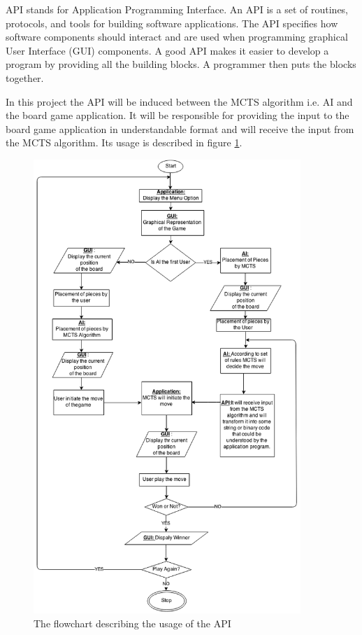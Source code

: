 API stands for Application Programming Interface. An API is a set of routines, protocols, and tools for building software applications. The API specifies how software components should interact and are used when programming graphical User Interface (GUI) components. A good API makes it easier to develop a program by providing all the building blocks. A programmer then puts the blocks together.

In this project the API will be induced between the MCTS algorithm i.e. AI and the board game application. It will be responsible for providing the input to the board game application in understandable format and will receive the input from the MCTS algorithm. Its usage is described in figure \ref{fig:flowchart}.
\newpage


\begin{figure}[H]
	\centering
	\includegraphics[width=0.9\textwidth]{2General_Architecture/2.2API/img/DiagramAPI.png}
	\caption{The flowchart describing the usage of the API}
	\label{fig:flowchart}
\end{figure}
\thispagestyle{empty}


